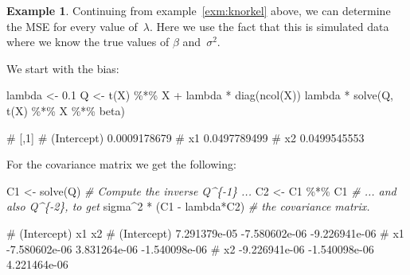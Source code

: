 \documentclass[
  a4paper,
]{article}
\newenvironment{Shaded}{\begin{snugshade}}{\end{snugshade}}
\newcommand{\CommentTok}[1]{\textcolor[rgb]{0.56,0.35,0.01}{\textit{#1}}}
\newcommand{\DecValTok}[1]{\textcolor[rgb]{0.00,0.00,0.81}{#1}}
\newcommand{\FloatTok}[1]{\textcolor[rgb]{0.00,0.00,0.81}{#1}}
\newcommand{\FunctionTok}[1]{\textcolor[rgb]{0.00,0.00,0.00}{#1}}
\newcommand{\NormalTok}[1]{#1}
\newcommand{\OtherTok}[1]{\textcolor[rgb]{0.56,0.35,0.01}{#1}}
\newcommand{\SpecialCharTok}[1]{\textcolor[rgb]{0.00,0.00,0.00}{#1}}
\theoremstyle{definition}
\theoremstyle{definition}
\newtheorem{example}{Example}[section]
\theoremstyle{definition}
\theoremstyle{definition}
\theoremstyle{remark}
\begin{document}
\begin{example}
Continuing from example~\ref{exm:knorkel} above, we can determine
the MSE for every value of~\(\lambda\). Here we
use the fact that this is simulated data where we know the true
values of \(\beta\) and~\(\sigma^2\).

We start with the bias:

\begin{Shaded}
\begin{Highlighting}[]
\NormalTok{lambda }\OtherTok{\textless{}{-}} \FloatTok{0.1}
\NormalTok{Q }\OtherTok{\textless{}{-}} \FunctionTok{t}\NormalTok{(X) }\SpecialCharTok{\%*\%}\NormalTok{ X }\SpecialCharTok{+}\NormalTok{ lambda }\SpecialCharTok{*} \FunctionTok{diag}\NormalTok{(}\FunctionTok{ncol}\NormalTok{(X))}
\NormalTok{lambda }\SpecialCharTok{*} \FunctionTok{solve}\NormalTok{(Q, }\FunctionTok{t}\NormalTok{(X) }\SpecialCharTok{\%*\%}\NormalTok{ X }\SpecialCharTok{\%*\%}\NormalTok{ beta)}
\end{Highlighting}
\end{Shaded}

\begin{Shaded}
\begin{Highlighting}[]
\NormalTok{\#                     [,1]}
\NormalTok{\# (Intercept) 0.0009178679}
\NormalTok{\# x1          0.0497789499}
\NormalTok{\# x2          0.0499545553}
\end{Highlighting}
\end{Shaded}

For the covariance matrix we get the following:

\begin{Shaded}
\begin{Highlighting}[]
\NormalTok{C1 }\OtherTok{\textless{}{-}} \FunctionTok{solve}\NormalTok{(Q) }\CommentTok{\# Compute the inverse Q\^{}\{{-}1\} ...}
\NormalTok{C2 }\OtherTok{\textless{}{-}}\NormalTok{ C1 }\SpecialCharTok{\%*\%}\NormalTok{ C1 }\CommentTok{\# ... and also Q\^{}\{{-}2\}, to get}
\NormalTok{sigma}\SpecialCharTok{\^{}}\DecValTok{2} \SpecialCharTok{*}\NormalTok{ (C1 }\SpecialCharTok{{-}}\NormalTok{ lambda}\SpecialCharTok{*}\NormalTok{C2) }\CommentTok{\# the covariance matrix.}
\end{Highlighting}
\end{Shaded}

\begin{Shaded}
\begin{Highlighting}[]
\NormalTok{\#               (Intercept)            x1            x2}
\NormalTok{\# (Intercept)  7.291379e{-}05 {-}7.580602e{-}06 {-}9.226941e{-}06}
\NormalTok{\# x1          {-}7.580602e{-}06  3.831264e{-}06 {-}1.540098e{-}06}
\NormalTok{\# x2          {-}9.226941e{-}06 {-}1.540098e{-}06  4.221464e{-}06}
\end{Highlighting}
\end{Shaded}


\end{example}
\end{document}
